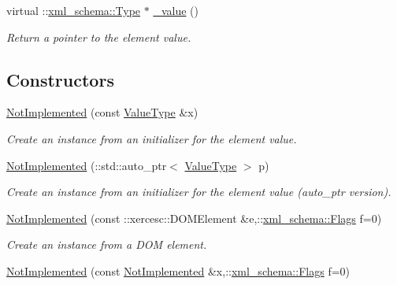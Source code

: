 \begin{DoxyCompactItemize}
virtual ::\hyperlink{namespacexml__schema_ad34e8fd175bf4f9fece6c670b01aa239}{xml\_\-schema::Type} $\ast$ \hyperlink{classopenstack_1_1xml_1_1NotImplemented_a4a4307886b3d76ffac7d9c9c34e41cbc}{\_\-value} ()
\begin{DoxyCompactList}\small\item\em Return a pointer to the element value. \item\end{DoxyCompactList}\end{DoxyCompactItemize}
\subsection*{Constructors}
\begin{DoxyCompactItemize}
\item 
\hyperlink{classopenstack_1_1xml_1_1NotImplemented_af002aba69c0811b9e9fee3ec062cd29d}{NotImplemented} (const \hyperlink{classopenstack_1_1xml_1_1NotImplementedAPIFault}{ValueType} \&x)
\begin{DoxyCompactList}\small\item\em Create an instance from an initializer for the element value. \item\end{DoxyCompactList}\item 
\hyperlink{classopenstack_1_1xml_1_1NotImplemented_a9b27338ea5bc3ef44d933b0ad67daa89}{NotImplemented} (::std::auto\_\-ptr$<$ \hyperlink{classopenstack_1_1xml_1_1NotImplementedAPIFault}{ValueType} $>$ p)
\begin{DoxyCompactList}\small\item\em Create an instance from an initializer for the element value (auto\_\-ptr version). \item\end{DoxyCompactList}\item 
\hyperlink{classopenstack_1_1xml_1_1NotImplemented_a26d80279c96fe0d79248be7a2e871353}{NotImplemented} (const ::xercesc::DOMElement \&e,::\hyperlink{namespacexml__schema_affb4c227cbd9aa7453dd1dc5a1401943}{xml\_\-schema::Flags} f=0)
\begin{DoxyCompactList}\small\item\em Create an instance from a DOM element. \item\end{DoxyCompactList}\item 
\hyperlink{classopenstack_1_1xml_1_1NotImplemented_afdff9e095e0d4293b1a0a34275066307}{NotImplemented} (const \hyperlink{classopenstack_1_1xml_1_1NotImplemented}{NotImplemented} \&x,::\hyperlink{namespacexml__schema_affb4c227cbd9aa7453dd1dc5a1401943}{xml\_\-schema::Flags} f=0)

\end{DoxyCompactItemize}
